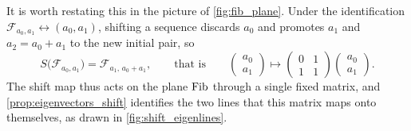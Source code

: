 It is worth restating this in the picture of \cref{fig:fib_plane}. Under the
identification $\mathcal{F}_{a_0,a_1} \leftrightarrow (a_0, a_1)$, shifting a sequence
discards $a_0$ and promotes $a_1$ and $a_2 = a_0 + a_1$ to the new initial pair, so
\begin{equation} \label{eq:shift_in_coordinates}
S\bigl( \mathcal{F}_{a_0, a_1} \bigr) = \mathcal{F}_{a_1, \, a_0 + a_1},
\qquad \text{that is} \qquad
\begin{pmatrix} a_0 \\ a_1 \end{pmatrix} \longmapsto
\begin{pmatrix} 0 & 1 \\ 1 & 1 \end{pmatrix}
\begin{pmatrix} a_0 \\ a_1 \end{pmatrix}.
\end{equation}
The shift map thus acts on the plane $\operatorname{Fib}$ through a single fixed matrix, and
\cref{prop:eigenvectors_shift} identifies the two lines that this matrix maps onto
themselves, as drawn in \cref{fig:shift_eigenlines}.

